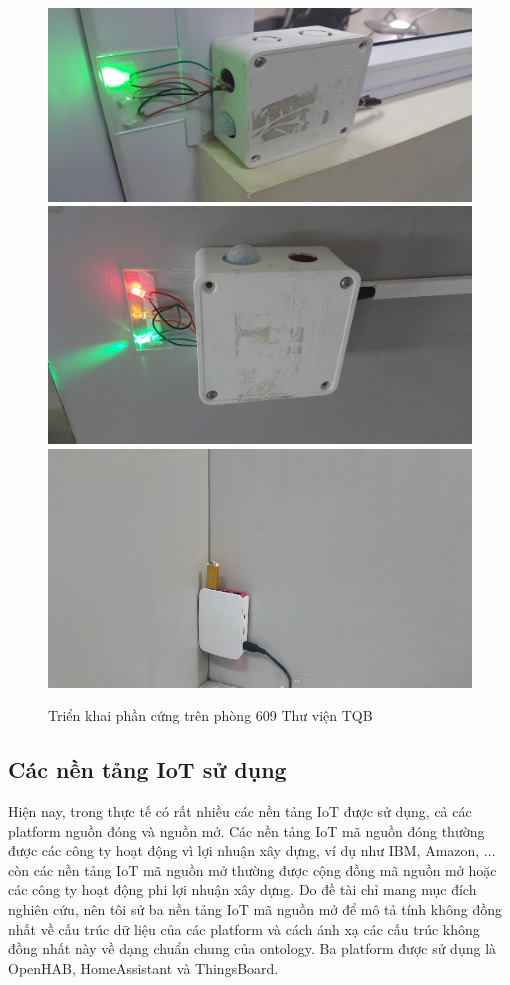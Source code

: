 \begin{figure}[h!]
	\center
	\includegraphics[scale=0.4]{image/hop_3}	
	\includegraphics[scale=0.5]{image/hop_4}
	\includegraphics[scale=1]{image/hop_5}
	\caption{Triển khai phần cứng trên phòng 609 Thư viện TQB}
	\label{fig:trien_khai_phan_cung}
\end{figure}


\subsection{Các nền tảng IoT sử dụng}
Hiện nay, trong thực tế có rất nhiều các nền tảng IoT được sử dụng, cả các platform nguồn đóng và nguồn mở. Các nền tảng IoT mã nguồn đóng thường được các công ty hoạt động vì lợi nhuận xây dựng, ví dụ như IBM, Amazon, ... còn các nền tảng IoT mã nguồn mở thường được cộng đồng mã nguồn mở hoặc các công ty hoạt động phi lợi nhuận xây dựng. Do đề tài chỉ mang mục đích nghiên cứu, nên tôi sử ba nền tảng IoT mã nguồn mở để mô tả tính không đồng nhất về cấu trúc dữ liệu của các platform và cách ánh xạ các cấu trúc không đồng nhất này về dạng chuẩn chung của ontology. Ba platform được sử dụng là OpenHAB, HomeAssistant và ThingsBoard.

